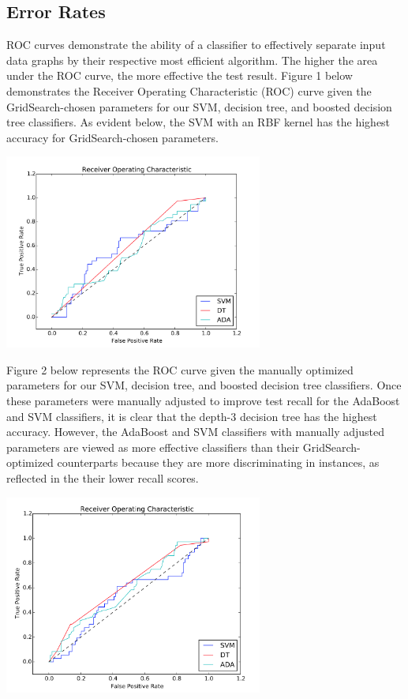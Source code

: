 \documentclass{article}
\begin{document}
\subsection{Error Rates}

ROC curves demonstrate the ability of a classifier to effectively separate input data graphs by their respective most efficient algorithm. The higher the area under the ROC curve, the more effective the test result. Figure 1 below demonstrates the Receiver Operating Characteristic (ROC) curve given the GridSearch-chosen parameters for our SVM, decision tree, and boosted decision tree classifiers. As evident below, the SVM with an RBF kernel has the highest accuracy for GridSearch-chosen parameters.

\includegraphics[width=8.5cm]{ROC}

Figure 2 below represents the ROC curve given the manually optimized parameters for our SVM, decision tree, and boosted decision tree classifiers. Once these parameters were manually adjusted to improve test recall for the AdaBoost and SVM classifiers, it is clear that the depth-3 decision tree has the highest accuracy. However, the AdaBoost and SVM classifiers with manually adjusted parameters are viewed as more effective classifiers than their GridSearch-optimized counterparts because they are more discriminating in instances, as reflected in the their lower recall scores.

\includegraphics[width=8.5cm]{ROC2}
\end{document}
